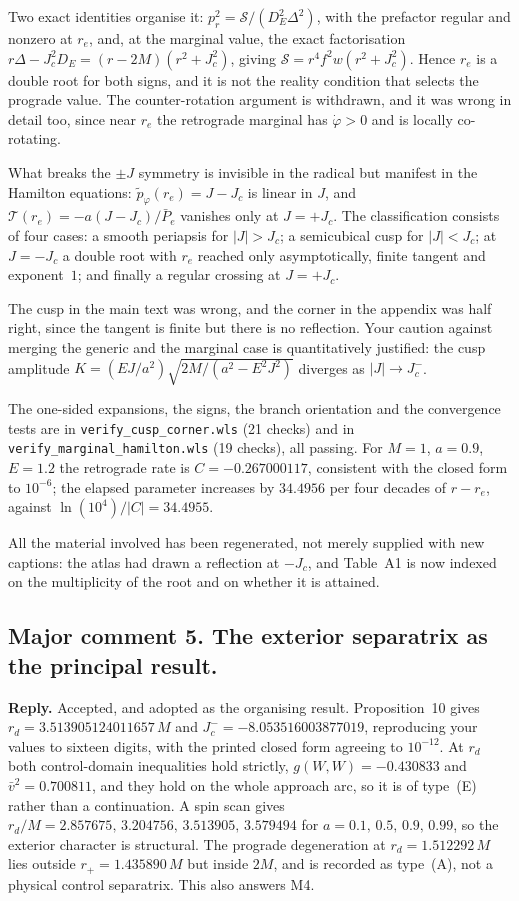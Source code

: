 \documentclass{article}
\begin{document}
Two exact identities organise it: \(p_r^2 = \mathcal{S}/(D^2_E\Delta ^2)\), with the
prefactor regular and nonzero at \(r_e\), and, at the marginal value, the exact
factorisation \(r\Delta -J_c^2D_E = (r-2M)(r^2+J_c^2)\), giving
\(\mathcal{S} = r^4f^2w(r^2+J_c^2)\). Hence \(r_e\) is a double root for both signs,
and it is not the reality condition that selects the prograde value. The
counter-rotation argument is withdrawn, and it was wrong in detail too, since near
\(r_e\) the retrograde marginal has \(\dot \varphi > 0\) and is locally co-rotating.

What breaks the \(\pm J\) symmetry is invisible in the radical but manifest in the
Hamilton equations: \(\tilde{p}_{\varphi}(r_e) = J-J_c\) is linear in \(J\), and
\(\mathcal{T}(r_e) = -a(J-J_c)/\bar{P}_e\) vanishes only at \(J=+J_c\). The
classification consists of four cases: a smooth periapsis for \(|J|>J_c\); a
semicubical cusp for \(|J|<J_c\); at \(J=-J_c\) a double root with \(r_e\) reached
only asymptotically, finite tangent and exponent~\(1\); and finally a regular
crossing at \(J=+J_c\).

The cusp in the main text was wrong, and the corner in the appendix was half right,
since the tangent is finite but there is no reflection. Your caution against merging
the generic and the marginal case is quantitatively justified: the cusp amplitude
\(K = (EJ/a^2)\sqrt{2M/(a^2-E^2J^2)}\) diverges as \(|J|\to J_c^-\).

The one-sided expansions, the signs, the branch orientation and the convergence
tests are in \texttt{verify\_cusp\_corner.wls} (21 checks) and in
\texttt{verify\_marginal\_hamilton.wls} (19 checks), all passing. For
\(M=1\), \(a=0.9\), \(E = 1.2\) the retrograde rate is \(C = -0.267000117\),
consistent with the closed form to \(10^{-6}\); the elapsed parameter increases by
\(34.4956\) per four decades of \(r-r_e\), against \(\ln(10^4)/|C| = 34.4955\).

All the material involved has been regenerated, not merely supplied with new
captions: the atlas had drawn a reflection at \(-J_c\), and Table~A1 is now indexed
on the multiplicity of the root and on whether it is attained.

\subsection{Major comment 5. The exterior separatrix as the principal result.}
\textbf{Reply.} Accepted, and adopted as the organising result. Proposition~10 gives
\(r_d = 3.513905124011657\,M\) and \(J_c^-=-8.053516003877019\), reproducing your
values to sixteen digits, with the printed closed form agreeing to \(10^{-12}\). At
\(r_d\) both control-domain inequalities hold strictly, \(g(W,W) = -0.430833\) and
\(\bar v^2 = 0.700811\), and they hold on the whole approach arc, so it is of
type~(E) rather than a continuation. A spin scan gives
\(r_d/M = 2.857675,\,3.204756,\,3.513905,\,3.579494\) for
\(a = 0.1,\,0.5,\,0.9,\,0.99\), so the exterior character is structural. The
prograde degeneration at \(r_d = 1.512292\,M\) lies outside \(r_+ = 1.435890\,M\)
but inside \(2M\), and is recorded as type~(A), not a physical control separatrix.
This also answers M4.
\end{document}
